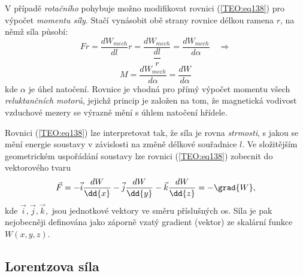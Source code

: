       V	případě \emph{rotačního} pohybuje možno modifikovat rovnici (\ref{TEO:eq138}) pro 
      výpočet \emph{momentu síly}. Stačí vynásobit obě strany rovnice délkou ramena \(r\), na němž 
      síla působí:
      \begin{equation*}
        Fr = \frac{dW_{mech}}{dl}r 
           = \frac{dW_{mech}}{\dfrac{dl}{r}} 
           = \frac{dW_{mech}}{d\alpha}
             \quad \Longrightarrow
      \end{equation*}
      \begin{equation*}
        \boxed{M = \frac{dW_{mech}}{d\alpha} = \frac{dW}{d\alpha}}
      \end{equation*}
      kde \(\alpha\) je úhel natočení. Rovnice je vhodná pro přímý výpočet momentu všech 
      \emph{reluktančních motorů}, jejichž princip je založen na tom, že magnetická vodivost 
      vzduchové mezery se výrazně mění s úhlem natočení hřídele.
      
      Rovnici (\ref{TEO:eq138}) lze interpretovat tak, že síla je rovna \emph{strmosti}, s 
      jakou se mění energie soustavy v závislosti na změně délkové souřadnice \(l\). Ve složitějším 
      geometrickém uspořádání soustavy lze rovnici (\ref{TEO:eq138}) zobecnit do vektorového 
      tvaru
      \begin{equation*}
       \vec{F} = -\vec{i}\frac{dW}{\dd{x}} -\vec{j}\frac{dW}{\dd{y}} -\vec{k}\frac{dW}{\dd{z}} 
               = - \grad{W},
      \end{equation*}
      kde \(\vec{i}, \vec{j}, \vec{k},\) jsou jednotkové vektory ve směru příslušných os. Síla je 
      pak nejobecněji definována jako záporně vzatý gradient (vektor) ze skalární funkce 
      \(W(x,y,z)\).
      
    \subsection{Lorentzova síla}
      
